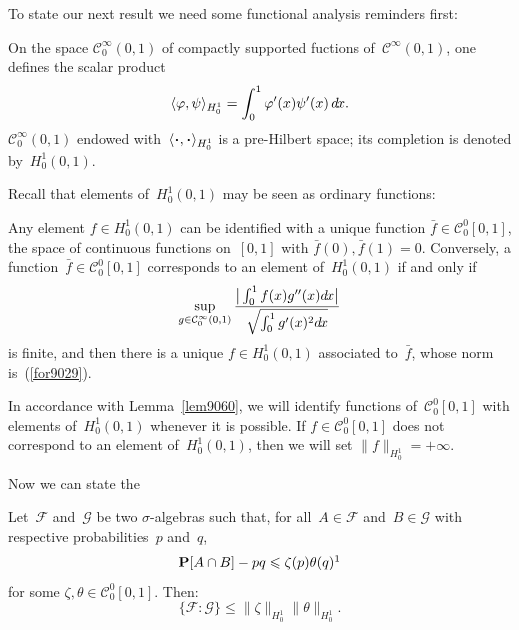 To state our next result we need some functional analysis reminders first:
\begin{Def}
On the space $\mathcal{C}^{\infty}_0(0,1)$ of compactly supported fuctions of~$\mathcal{C}^{\infty}(0,1)$,
one defines the scalar product
\[ \langle\phi,\psi\rangle_{H^1_0} = \int_0^1 \phi'(x)\psi'(x) \,\dx{x} .\]
$\mathcal{C}^{\infty}_0(0,1)$ endowed with~$\langle\Bcdot,\Bcdot\rangle_{H^1_0}$ is a pre-Hilbert space;
its completion is denoted by~$H^1_0(0,1)$.
\end{Def}
%
Recall that elements of~$H^1_0(0,1)$ may be seen as ordinary functions:
\begin{Lem}\label{lem9060}
Any element $f \in H^1_0(0,1)$ can be identified with a unique function
$\bar{f} \in \mathcal{C}^0_0[0,1]$, the space of continuous functions on~$[0,1]$
with $\bar{f}(0), \bar{f}(1) = 0$.
Conversely, a function~$\bar{f} \in \mathcal{C}^0_0[0,1]$ corresponds to
an element of~$H^1_0(0,1)$ if and only if
\[\label{for9029}
\sup_{g\in\mathcal{C}^{\infty}_0(0,1)}
\frac{\big|\int_0^1 f(x)g''(x)\dx{x}\big|}{\sqrt{\int_0^1 g'(x)^2\dx{x}}} \]
is finite, and then there is a unique $f\in H^1_0(0,1)$ associated to~$\bar{f}$,
whose norm is~(\ref{for9029}).
\end{Lem}
%
In accordance with Lemma~\ref{lem9060}, we will identify functions of~$\mathcal{C}^0_0[0,1]$
with elements of~$H^1_0(0,1)$ whenever it is possible. If $f\in\mathcal{C}^0_0[0,1]$
does not correspond to an element of~$H^1_0(0,1)$, then we will set $\|f\|_{H^1_0} = +\infty$.

Now we can state the
%
\begin{Thm}\label{thm0367a}
Let~$\mathcal{F}$ and~$\mathcal{G}$ be two $\sigma$-algebras
such that, for all~$A\in\mathcal{F}$ and~$B\in\mathcal{G}$
with respective probabilities~$p$ and~$q$,
\[\label{for0256} \Pr[A\cap B]-pq \leq \zeta(p)\theta(q) \footnotemark\]
%
for some $\zeta, \theta \in \mathcal{C}^0_0[0,1]$.
Then:
\[\label{for0458} \{\mathcal{F}:\mathcal{G}\} \leq \|\zeta\|_{H^1_0} \|\theta\|_{H^1_0} .\]
\end{Thm}

